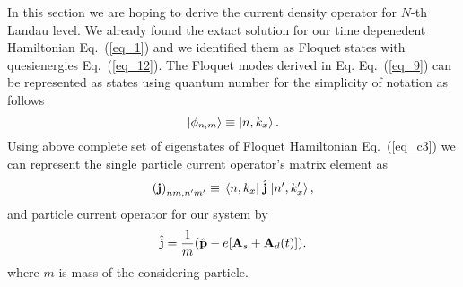 In this section we are hoping to derive the current density operator for $N$-th Landau level. We already found the extact solution for our time depenedent Hamiltonian Eq.~(\ref{eq_1}) and we identified them as Floquet states with quesienergies Eq.~(\ref{eq_12}). The Floquet modes derived in Eq. Eq.~(\ref{eq_9}) can be represented as states using quantum number for the simplicity of notation as follows
\begin{equation} \label{eq_d1}
  \ket{\phi_{n,m}} \equiv \ket{n,k_x}.
\end{equation}
Using above complete set of eigenstates of Floquet Hamiltonian Eq.~(\ref{eq_c3}) \cite{wackerl20,holthaus15,grifoni98} we can represent the single particle current operator's matrix element as
\begin{equation} \label{eq_d2}
  \qty(\vb{j})_{nm,n'm'} \equiv \mel{n,k_x}{\;\hat{\vb{j}}\;}{n',k'_x},
\end{equation}
and particle current operator for our system \cite{mahan00,bruus04} by
\begin{equation} \label{eq_d3}
  \hat{\vb{j}} = \frac{1}{m} \qty(\hat{\vb{p}} - e\qty[\vb{A}_s + \vb{A}_d(t)]).
\end{equation}
where $m$ is mass of the considering particle.

